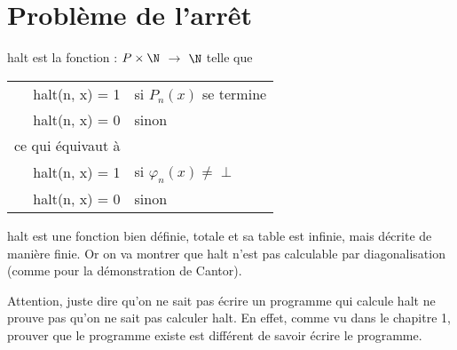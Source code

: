 \section{Problème de l'arrêt}
\label{sec:probl_me_de_l_arr_t}

\begin{mydef}[halt]
	halt est la fonction : $P \times \N$ $\rightarrow$ $\N$ telle que \\
	\begin{tabular}{rl}
	  halt(n, x) = 1 & si $P_n(x)$ se termine \\
	  halt(n, x) = 0 & sinon \\
	  ce qui équivaut à &\\
	  halt(n, x) = 1 & si $\varphi_n(x)\neq \perp$ \\
	  halt(n, x) = 0 & sinon \\
	\end{tabular}
\end{mydef}

\begin{myprop}
	halt est une fonction bien définie, totale et sa table est infinie, mais décrite de manière finie. Or on va montrer que halt n'est pas calculable par diagonalisation (comme pour la démonstration de Cantor).\\
\end{myprop}

\begin{myrem}
	Attention, juste dire qu'on ne sait pas écrire un programme qui calcule halt ne prouve pas qu'on ne sait pas calculer halt. En effet, comme vu dans le chapitre 1, prouver que le programme existe est différent de savoir écrire le programme.
\end{myrem}

